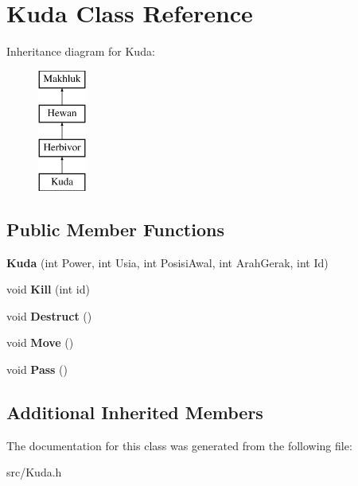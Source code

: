 \hypertarget{class_kuda}{}\section{Kuda Class Reference}
\label{class_kuda}
Inheritance diagram for Kuda\+:\begin{figure}[H]
\begin{center}
\leavevmode
\includegraphics[height=4.000000cm]{class_kuda}
\end{center}
\end{figure}
\subsection*{Public Member Functions}
\begin{DoxyCompactItemize}
\item 
\hypertarget{class_kuda_a35d8c8dc79380dc70ef97d87f7938032}{}{\bfseries Kuda} (int Power, int Usia, int Posisi\+Awal, int Arah\+Gerak, int Id)\label{class_kuda_a35d8c8dc79380dc70ef97d87f7938032}

\item 
\hypertarget{class_kuda_a37132bb9a3e1e6efce091fc16b1191ee}{}void {\bfseries Kill} (int id)\label{class_kuda_a37132bb9a3e1e6efce091fc16b1191ee}

\item 
\hypertarget{class_kuda_ad82609445b57f89833c4d05bab826471}{}void {\bfseries Destruct} ()\label{class_kuda_ad82609445b57f89833c4d05bab826471}

\item 
\hypertarget{class_kuda_a36cd1827c2069b0ee09e086b0442a325}{}void {\bfseries Move} ()\label{class_kuda_a36cd1827c2069b0ee09e086b0442a325}

\item 
\hypertarget{class_kuda_a1d80e3ba3657520926f2a4eb8cb78f02}{}void {\bfseries Pass} ()\label{class_kuda_a1d80e3ba3657520926f2a4eb8cb78f02}

\end{DoxyCompactItemize}
\subsection*{Additional Inherited Members}


The documentation for this class was generated from the following file\+:\begin{DoxyCompactItemize}
\item 
src/Kuda.\+h\end{DoxyCompactItemize}
